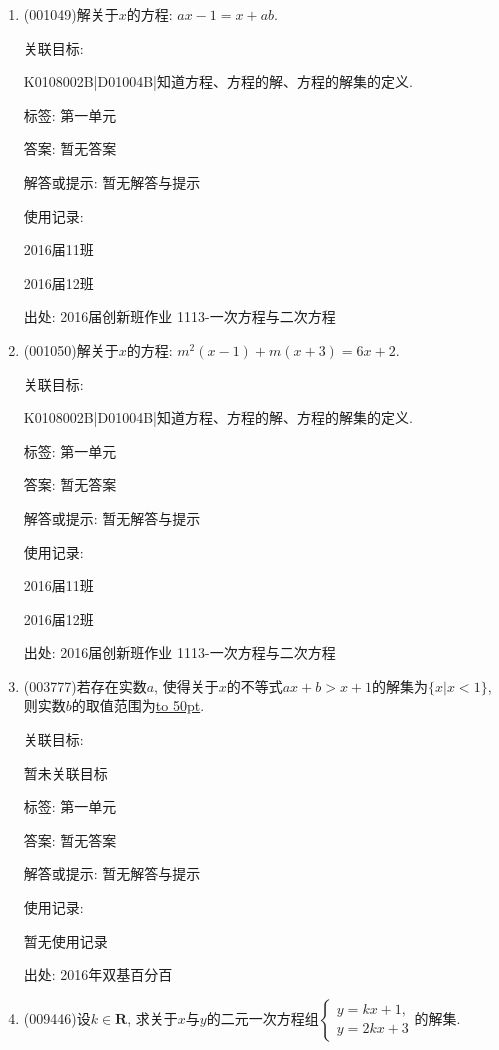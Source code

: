 \documentclass[10pt,a4paper]{article}
\newcommand{\blank}[1]{\underline{\hbox to #1pt{}}}
\begin{document}
\begin{enumerate}[1.]

\item { (001049)}解关于$x$的方程: $ax-1=x+ab$.


关联目标:

K0108002B|D01004B|知道方程、方程的解、方程的解集的定义.



标签: 第一单元

答案: 暂无答案

解答或提示: 暂无解答与提示

使用记录:

2016届11班	

2016届12班	


出处: 2016届创新班作业	1113-一次方程与二次方程
\item { (001050)}解关于$x$的方程: $m^2(x-1)+m(x+3)=6x+2$.


关联目标:

K0108002B|D01004B|知道方程、方程的解、方程的解集的定义.



标签: 第一单元

答案: 暂无答案

解答或提示: 暂无解答与提示

使用记录:

2016届11班	

2016届12班	


出处: 2016届创新班作业	1113-一次方程与二次方程
\item { (003777)}若存在实数$a$, 使得关于$x$的不等式$ax+b>x+1$的解集为$\{x|x<1\}$, 则实数$b$的取值范围为\blank{50}.


关联目标:

暂未关联目标



标签: 第一单元

答案: 暂无答案

解答或提示: 暂无解答与提示

使用记录:

暂无使用记录


出处: 2016年双基百分百
\item { (009446)}设$k\in \mathbf{R}$, 求关于$x$与$y$的二元一次方程组$\begin{cases}y=kx+1, \\ y=2kx+3 \end{cases}$的解集.



\end{enumerate}
\end{document}
